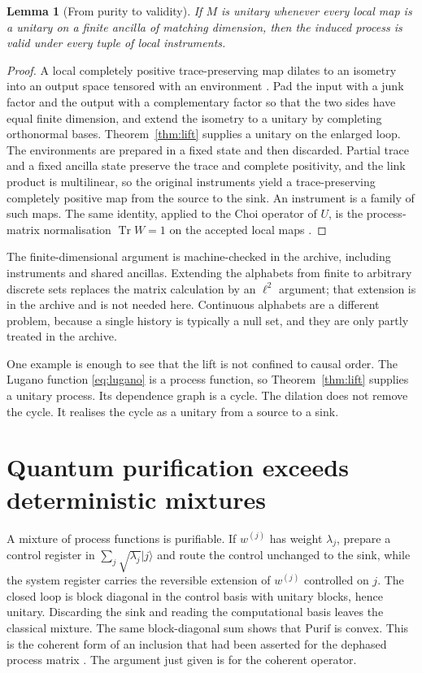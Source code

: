\documentclass[11pt]{article}
\newtheorem{lemma}[theorem]{Lemma}
\theoremstyle{definition}
\theoremstyle{remark}
\newcommand{\ket}[1]{\lvert #1\rangle}
\newcommand{\Purif}{\mathrm{Purif}}
\begin{document}
\begin{lemma}[From purity to validity]
\label{lem:valid}
If \(M\) is unitary whenever every local map is a unitary on a finite ancilla of matching dimension, then the induced process is valid under every tuple of local instruments.
\end{lemma}

\begin{proof}
A local completely positive trace-preserving map dilates to an isometry into an output space tensored with an environment \cite{stinespring1955}. Pad the input with a junk factor and the output with a complementary factor so that the two sides have equal finite dimension, and extend the isometry to a unitary by completing orthonormal bases. Theorem~\ref{thm:lift} supplies a unitary on the enlarged loop. The environments are prepared in a fixed state and then discarded. Partial trace and a fixed ancilla state preserve the trace and complete positivity, and the link product is multilinear, so the original instruments yield a trace-preserving completely positive map from the source to the sink. An instrument is a family of such maps. The same identity, applied to the Choi operator of \(U\), is the process-matrix normalisation \(\operatorname{Tr} W=1\) on the accepted local maps \cite{araujo2017,choi1975}.
\end{proof}

The finite-dimensional argument is machine-checked in the archive, including instruments and shared ancillas. Extending the alphabets from finite to arbitrary discrete sets replaces the matrix calculation by an \(\ell^2\) argument; that extension is in the archive and is not needed here. Continuous alphabets are a different problem, because a single history is typically a null set, and they are only partly treated in the archive.

One example is enough to see that the lift is not confined to causal order. The Lugano function \eqref{eq:lugano} is a process function, so Theorem~\ref{thm:lift} supplies a unitary process. Its dependence graph is a cycle. The dilation does not remove the cycle. It realises the cycle as a unitary from a source to a sink.

\section{Quantum purification exceeds deterministic mixtures}
\label{sec:pur}

A mixture of process functions is purifiable. If \(w^{(j)}\) has weight \(\lambda_j\), prepare a control register in \(\sum_j\sqrt{\lambda_j}\ket{j}\) and route the control unchanged to the sink, while the system register carries the reversible extension of \(w^{(j)}\) controlled on \(j\). The closed loop is block diagonal in the control basis with unitary blocks, hence unitary. Discarding the sink and reading the computational basis leaves the classical mixture. The same block-diagonal sum shows that \(\Purif\) is convex. This is the coherent form of an inclusion that had been asserted for the dephased process matrix \cite{baumeler2022}. The argument just given is for the coherent operator.
\end{document}
